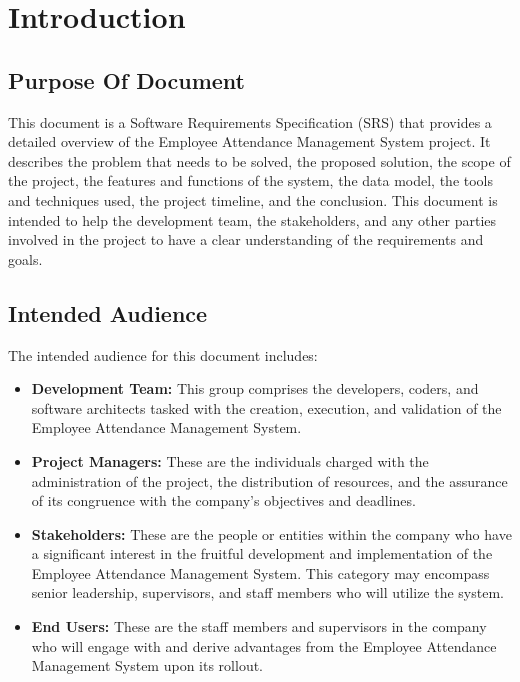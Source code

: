 \documentclass[a4paper, 12pt]{article}
\begin{document}
\section{Introduction}

\subsection{Purpose Of Document}
This document is a Software Requirements Specification (SRS) that provides a detailed overview of the Employee Attendance Management System project. It describes the problem that needs to be solved, the proposed solution, the scope of the project, the features and functions of the system, the data model, the tools and techniques used, the project timeline, and the conclusion. This document is intended to help the development team, the stakeholders, and any other parties involved in the project to have a clear understanding of the requirements and goals.

\subsection{Intended Audience}
The intended audience for this document includes:
\begin{itemize}
    \item \textbf{Development Team: }This group comprises the developers, coders, and software architects tasked with the creation, execution, and validation of the Employee Attendance Management System.
    \item \textbf{Project Managers: }These are the individuals charged with the administration of the project, the distribution of resources, and the assurance of its congruence with the company’s objectives and deadlines.
    \item \textbf{Stakeholders: }These are the people or entities within the company who have a significant interest in the fruitful development and implementation of the Employee Attendance Management System. This category may encompass senior leadership, supervisors, and staff members who will utilize the system.
    \item \textbf{End Users: }These are the staff members and supervisors in the company who will engage with and derive advantages from the Employee Attendance Management System upon its rollout.
\end{itemize}
\end{document}
